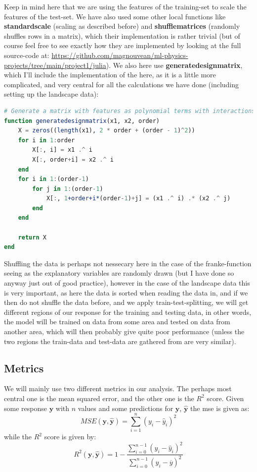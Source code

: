 \documentclass{article}
\begin{document}
Keep in mind here that we are using the features of the training-set to scale
the features of the test-set. We have also used some other local functions like
\textbf{standardscale} (scaling as described before) and
\textbf{shufflematrices} (randomly shuffles rows in a matrix), which their
implementation is rather trivial (but of course feel free to see exactly how
they are implemented by looking at the full source-code at:
\url{https://github.com/magnouvean/ml-physics-projects/tree/main/project1/julia}).
We also here use \textbf{generatedesignmatrix}, which I'll include the
implementation of the here, as it is a little more complicated, and very central
for all the calculations we have done (including setting up the landscape data):
\begin{lstlisting}[language=julia]
# Generate a matrix with features as polynomial terms with interactions
function generatedesignmatrix(x1, x2, order)
    X = zeros((length(x1), 2 * order + (order - 1)^2))
    for i in 1:order
        X[:, i] = x1 .^ i
        X[:, order+i] = x2 .^ i
    end
    for i in 1:(order-1)
        for j in 1:(order-1)
            X[:, 1+order+i*(order-1)+j] = (x1 .^ i) .* (x2 .^ j)
        end
    end

    return X
end
\end{lstlisting}

Shuffling the data is perhaps not nessecary here in the case of the
franke-function seeing as the explanatory variables are randomly drawn (but I
have done so anyway just out of good practice), however in the case of the
landscape data this is very important, as here the data is sorted when reading
the data in, and if we then do not shuffle the data before, and we apply
train-test-splitting, we will get different regions of our response for the
training and testing data, in other words, the model will be trained on data
from some area and tested on data from another area, which will then probably
give quite poor performance (unless the two regions the train-data and test-data
are gathered from are very similar).

\subsection{Metrics}
We will mainly use two different metrics in our analysis. The perhaps most
central one is the mean squared error, and the other one is the $R^2$ score.
Given some response $\mathbf{y}$ with $n$ values and some predictions for
$\mathbf{y}$, $\hat{\mathbf{y}}$ the mse is given as: \cite{week34notes}
$$MSE(\mathbf{y}, \hat{\mathbf{y}}) = \sum_{i=1}^n (y_i - \hat{y}_i)^2$$
while the $R^2$ score is given by: \cite{week34notes}
$$R^2(\mathbf{y}, \hat{\mathbf{y}}) = 1 - \frac{\sum_{i=0}^{n-1} (y_i - \hat{y}_i)^2}{\sum_{i=0}^{n-1}(y_i - \overline{y})^2}$$
\end{document}
